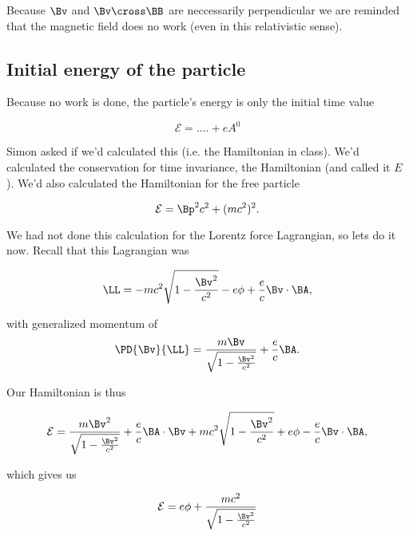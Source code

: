 Because $\Bv$ and $\Bv \cross \BB$ are neccessarily perpendicular we are reminded that the magnetic field does no work (even in this relativistic sense).

\subsection{Initial energy of the particle}

Because no work is done, the particle's energy is only the initial time value

\begin{equation}\label{eqn:relativisticElectrodynamicsT3:520}
\mathcal{E} = .... + e A^0
\end{equation}

Simon asked if we'd calculated this (i.e. the Hamiltonian in class).  We'd calculated the conservation for time invariance, the Hamiltonian (and called it $E$).  We'd also calculated the Hamiltonian for the free particle

\begin{equation}\label{eqn:relativisticElectrodynamicsT3:530}
\mathcal{E} = \Bp^2 c^2 + (m c^2)^2.
\end{equation}

We had not done this calculation for the Lorentz force Lagrangian, so lets do it now.  Recall that this Lagrangian was

\begin{equation}\label{eqn:relativisticElectrodynamicsT3:531}
\LL = 
- m c^2 \sqrt{1 - \frac{\Bv^2}{c^2}} - e \phi + \frac{e}{c} \Bv \cdot \BA,
\end{equation}

with generalized momentum of 
\begin{equation}\label{eqn:relativisticElectrodynamicsT3:532}
\PD{\Bv}{\LL} = \frac{m \Bv}{\sqrt{1 - \frac{\Bv^2}{c^2}}} + \frac{e}{c} \BA.
\end{equation}

Our Hamiltonian is thus

\begin{align*}
\mathcal{E} 
= 
\frac{m \Bv^2}{\sqrt{1 - \frac{\Bv^2}{c^2}}} + \frac{e}{c} \BA \cdot \Bv
+ m c^2 \sqrt{1 - \frac{\Bv^2}{c^2}} + e \phi - \frac{e}{c} \Bv \cdot \BA,
\end{align*}

which gives us

\begin{align*}
\mathcal{E} = e \phi + \frac{m c^2}{\sqrt{1 - \frac{\Bv^2}{c^2}}} 
\end{align*}


